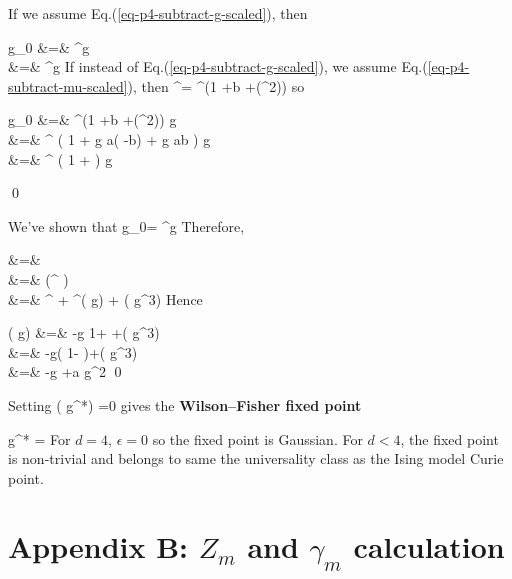 If we assume Eq.(\ref{eq-p4-subtract-g-scaled}), then

\beqa
 g_0 
&=&
\mu^\eps  g
\\
&=&
\mu^\eps  g
\eeqa
If instead of Eq.(\ref{eq-p4-subtract-g-scaled}),  we assume Eq.(\ref{eq-p4-subtract-mu-scaled}), then
\beq
\tilde{\mu}^\eps=
\mu^\eps\left(1 +\eps b
+\calo(\eps^2)\right)
\eeq
so

\beqa
 g_0 &=& 
\mu^\eps\left(1 +\eps b
+\calo(\eps^2)\right)
 g
\\
&=&
\mu^\eps
\left(
 1 +  g a\left(
-b\right)
+ g ab
\right) g
\\
&=&
\mu^\eps
\left(
 1 +
\right) g
\eeqa

\qed


\begin{claim} 

\beq
{}
\eeq


\end{claim}
\proof

We've shown that
\beq
 g_0=
\mu^\eps  g
\eeq
Therefore,

&=&\mu{}
\\
&=&
\mu{}
\left(\mu^\eps
{}\right)
\\
&=&
\eps\mu^\eps
{}
+
\mu^\eps \beta( g)
+
\calo( g^3)
\eeqa
Hence

\beqa
\beta( g)
&=&
-\eps g
{1+} +\calo( g^3)
\\
&=&
-\eps g\left(
1- 
\right)+\calo( g^3)
\\
&=& -\eps g +a  g^2
\eeqa
\qed


Setting
\beq
\beta(  g^*) =0
\eeq
gives the {\bf Wilson–Fisher fixed point}

\beq
  g^* =
 \eps
\eeq
For $d=4$, 
$
\epsilon=0
$
so the fixed point is Gaussian.
For $d<4$, the fixed point is non-trivial and belongs to same the universality class
as the Ising model Curie point.

\section{Appendix B: $Z_m$ and $\gamma_m$ calculation}
\label{sec-p4-gamma-m-calc}



